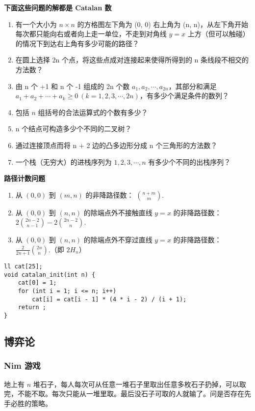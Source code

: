 \documentclass[UTF8]{article}
\begin{document}
\noindent \textbf{下面这些问题的解都是 Catalan 数}
\begin{enumerate}
	\item 有一个大小为 $n\times n$ 的方格图左下角为 (0, 0) 右上角为 (n, n)，从左下角开始每次都只能向右或者向上走一单位，不走到对角线 $y=x$ 上方（但可以触碰）的情况下到达右上角有多少可能的路径？
	\item 在圆上选择 2n 个点，将这些点成对连接起来使得所得到的 n 条线段不相交的方法数？
	\item 由 n 个 +1 和 n 个 -1 组成的 2n 个数 $a_1,a_2, \cdots ,a_{2n}$，其部分和满足 $a_1+a_2+ \cdots +a_k \geq 0~(k=1,2,3, \cdots ,2n)$，有多少个满足条件的数列？
	\item 包括 $n$ 组括号的合法运算式的个数有多少？
	\item n 个结点可构造多少个不同的二叉树？
	\item 通过连接顶点而将 n + 2 边的凸多边形分成 n 个三角形的方法数？
	\item 一个栈（无穷大）的进栈序列为 $1,2,3, \cdots ,n$ 有多少个不同的出栈序列？
\end{enumerate}

\noindent \textbf{路径计数问题}
\begin{enumerate}
	\item 从 $(0,0)$ 到 $(m,n)$ 的非降路径数： $\binom{n + m}{m}$.
	\item 从 $(0,0)$ 到 $(n,n)$ 的除端点外不接触直线 $y = x$ 的非降路径数：$2 \binom{2n - 2}{n - 1} - 2 \binom{2n - 2}{n}$.
	\item 从 $(0,0)$ 到 $(n,n)$ 的除端点外不穿过直线 $y = x$ 的非降路径数：$\frac{2}{2n + 1} \binom{2n}{n}$.（即 $2H_n$）
\end{enumerate}

\begin{lstlisting}[caption=卡特兰数]
ll cat[25];
void catalan_init(int n) {
    cat[0] = 1;
    for (int i = 1; i <= n; i++)
        cat[i] = cat[i - 1] * (4 * i - 2) / (i + 1);
    return ;
}
\end{lstlisting}


\subsection{博弈论}
\subsubsection{Nim 游戏}
地上有 $n$ 堆石子，每人每次可从任意一堆石子里取出任意多枚石子扔掉，可以取完，不能不取。每次只能从一堆里取。最后没石子可取的人就输了。问是否存在先手必胜的策略。
\end{document}
